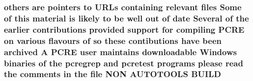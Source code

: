 \subsubsection[{\texorpdfstring{B\+U\+I\+LD}{BUILD}}]{\setlength{\rightskip}{0pt plus 5cm}others {\bf are} pointers {\bf to} U\+R\+Ls containing relevant {\bf files} Some {\bf of} {\bf this} material {\bf is} likely {\bf to} {\bf be} well {\bf out} {\bf of} date Several {\bf of} the earlier contributions provided {\bf support} for {\bf compiling} {\bf P\+C\+RE} {\bf on} various flavours {\bf of} {\bf so} these contibutions have been archived {\bf A} {\bf P\+C\+RE} user maintains downloadable {\bf Windows} binaries {\bf of} the pcregrep and {\bf pcretest} programs please {\bf read} the comments {\bf in} the {\bf file} N\+ON A\+U\+T\+O\+T\+O\+O\+LS B\+U\+I\+LD}\hypertarget{README_8txt_ab07585787ca6d31db8567def1616d200}{}\label{README_8txt_ab07585787ca6d31db8567def1616d200}
